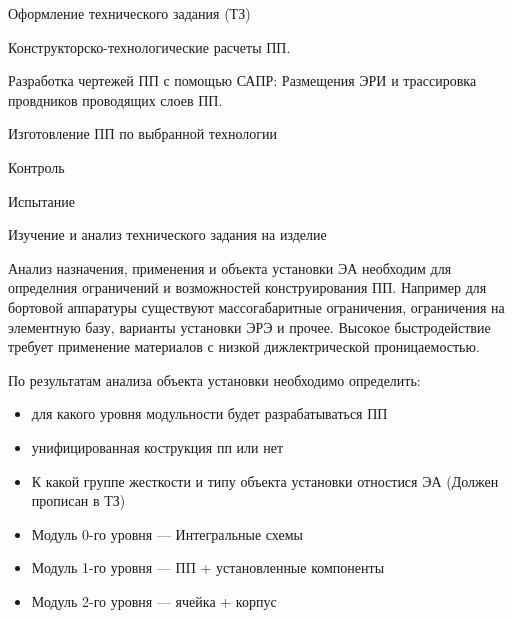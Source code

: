 \documentclass{article}
\begin{document}
Оформление технического задания (ТЗ)

Конструкторско-технологические расчеты ПП.

Разработка чертежей ПП с помощью САПР: Размещения ЭРИ и трассировка провдников проводящих слоев ПП.

Изготовление ПП по выбранной технологии

Контроль

Испытание

Изучение и анализ технического задания на изделие

Анализ назначения, применения и объекта установки ЭА необходим для определния ограничений и возможностей конструирования ПП. Например для бортовой аппаратуры существуют массогабаритные ограничения, ограничения на элементную базу, варианты установки ЭРЭ и прочее. Высокое быстродействие требует применение материалов с низкой дижлектрической проницаемостью.

По результатам анализа объекта установки необходимо определить:
\begin{itemize}
	\item для какого уровня модульности будет разрабатываться ПП
	\item унифицированная кострукция пп или нет
	\item К какой группе жесткости и типу объекта установки отностися ЭА (Должен прописан в ТЗ)
\end{itemize}
\begin{itemize}
	\item Модуль 0-го уровня --- Интегральные схемы
	\item Модуль 1-го уровня --- ПП + установленные компоненты
	\item Модуль 2-го уровня --- ячейка + корпус
\end{itemize}
\end{document}
